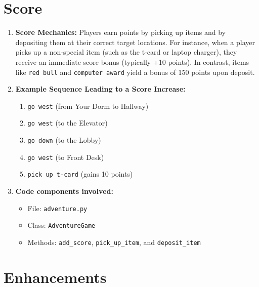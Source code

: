 \documentclass[11pt]{article}
\begin{document}
\section*{Score}
\begin{enumerate}
    \item \textbf{Score Mechanics:}  
    Players earn points by picking up items and by depositing them at their correct target locations. For instance, when a player picks up a non-special item (such as the t-card or laptop charger), they receive an immediate score bonus (typically +10 points). In contrast, items like \texttt{red bull} and \texttt{computer award} yield a bonus of 150 points upon deposit.
    
    \item \textbf{Example Sequence Leading to a Score Increase:}
    \begin{enumerate}
         \item \texttt{go west} (from Your Dorm to Hallway)
         \item \texttt{go west} (to the Elevator)
         \item \texttt{go down} (to the Lobby)
         \item \texttt{go west} (to Front Desk)
         \item \texttt{pick up t-card} (gains 10 points)
    \end{enumerate}
    
    \item \textbf{Code components involved:}
    \begin{itemize}
         \item File: \texttt{adventure.py}
         \item Class: \texttt{AdventureGame}
         \item Methods: \texttt{add\_score}, \texttt{pick\_up\_item}, and \texttt{deposit\_item}
    \end{itemize}
\end{enumerate}

\section*{Enhancements}
\end{document}
